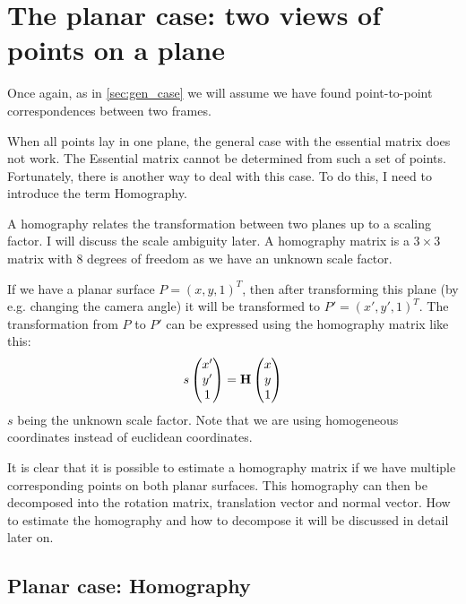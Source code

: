 \section{The planar case: two views of points on a plane}
Once again, as in \autoref{sec:gen_case} we will assume we have found point-to-point correspondences between two frames.

When all points lay in one plane, the general case with the essential matrix does not work. The Essential matrix cannot be determined from such a set of points. Fortunately, there is another way to deal with this case. To do this, I need to introduce the term Homography. \bigskip

A homography relates the transformation between two planes up to a scaling factor. I will discuss the scale ambiguity later. A homography matrix is a $3\times3$ matrix with 8 degrees of freedom as we have an unknown scale factor.\bigskip

If we have a planar surface $P = (x, y, 1)^T$, then after transforming this plane (by e.g. changing the camera angle) it will be transformed to $P' = (x', y', 1)^T$. The transformation from $P$ to $P'$ can be expressed using the homography matrix like this:
\begin{equation}
    s\begin{pmatrix}
        x' \\ y' \\ 1
    \end{pmatrix} = \mathbf{H} \begin{pmatrix}
        x \\ y \\ 1
    \end{pmatrix}
\end{equation}
$s$ being the unknown scale factor. Note that we are using homogeneous coordinates instead of euclidean coordinates.\bigskip

It is clear that it is possible to estimate a homography matrix if we have multiple corresponding points on both planar surfaces. This homography can then be decomposed into the rotation matrix, translation vector and normal vector. How to estimate the homography and how to decompose it will be discussed in detail later on.

\subsection{Planar case: Homography}

